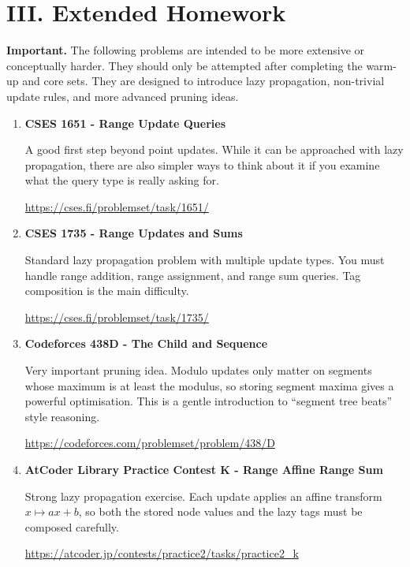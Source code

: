 \documentclass[11pt]{article}
\begin{document}
\section*{III. Extended Homework}

\textbf{Important.} The following problems are intended to be more extensive or
conceptually harder.
They should only be attempted after completing the warm-up and core sets.
They are designed to introduce lazy propagation, non-trivial update rules, and
more advanced pruning ideas.

\medskip

\begin{enumerate}

    \item \textbf{CSES 1651 - Range Update Queries}

    A good first step beyond point updates. While it can be approached with
    lazy propagation, there are also simpler ways to think about it if you
    examine what the query type is really asking for.

    \vspace{0.3em}
    {\small\url{https://cses.fi/problemset/task/1651/}}

    \vspace{0.8em}

    \item \textbf{CSES 1735 - Range Updates and Sums}

    Standard lazy propagation problem with multiple update types.
    You must handle range addition, range assignment, and range sum queries.
    Tag composition is the main difficulty.

    \vspace{0.3em}
    {\small\url{https://cses.fi/problemset/task/1735/}}

    \vspace{0.8em}

    \item \textbf{Codeforces 438D - The Child and Sequence}

    Very important pruning idea. Modulo updates only matter on segments whose
    maximum is at least the modulus, so storing segment maxima gives a powerful
    optimisation. This is a gentle introduction to ``segment tree beats''
    style reasoning.

    \vspace{0.3em}
    {\small\url{https://codeforces.com/problemset/problem/438/D}}

    \vspace{0.8em}

    \item \textbf{AtCoder Library Practice Contest K - Range Affine Range Sum}

    Strong lazy propagation exercise. Each update applies an affine transform
    \(x \mapsto ax + b\), so both the stored node values and the lazy tags must
    be composed carefully.

    \vspace{0.3em}
    {\small\url{https://atcoder.jp/contests/practice2/tasks/practice2_k}}

\end{enumerate}
\end{document}
